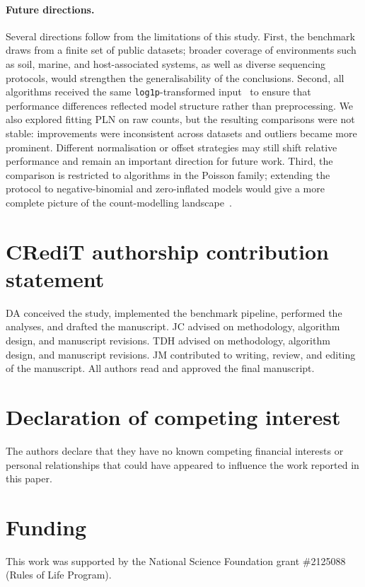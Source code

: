 \documentclass[preprint,review,12pt,authoryear]{elsarticle}
\begin{document}
\paragraph{Future directions.}
Several directions follow from the limitations of this study.
First, the benchmark draws from a finite set of public datasets; broader coverage of environments such as soil, marine, and host-associated systems, as well as diverse sequencing protocols, would strengthen the generalisability of the conclusions.
Second, all algorithms received the same \texttt{log1p}-transformed input~\citep{doi:10.1128/mSystems.00016-19} to ensure that performance differences reflected model structure rather than preprocessing.
We also explored fitting PLN on raw counts, but the resulting comparisons were not stable: improvements were inconsistent across datasets and outliers became more prominent.
Different normalisation or offset strategies may still shift relative performance and remain an important direction for future work.
Third, the comparison is restricted to algorithms in the Poisson family; extending the protocol to negative-binomial and zero-inflated models would give a more complete picture of the count-modelling landscape~\citep{10.1038/s41598-024-76513-8,10.1101/538579,10.1093/bioadv/vbae167,Champion2024OneNet}.

\section*{CRediT authorship contribution statement}
DA conceived the study, implemented the benchmark pipeline, performed the analyses, and drafted the manuscript.
JC advised on methodology, algorithm design, and manuscript revisions.
TDH advised on methodology, algorithm design, and manuscript revisions.
JM contributed to writing, review, and editing of the manuscript.
All authors read and approved the final manuscript.

\section*{Declaration of competing interest}
The authors declare that they have no known competing financial interests or personal relationships that could have appeared to influence the work reported in this paper.

\section*{Funding}
This work was supported by the National Science Foundation grant \#2125088 (Rules of Life Program).
\end{document}
